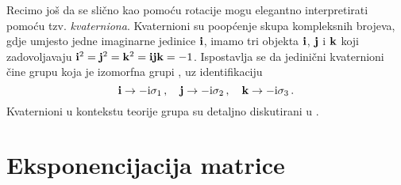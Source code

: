 Recimo još da se slično kao pomoću  rotacije mogu elegantno
interpretirati pomoću tzv. \emph{kvaterniona}. Kvaternioni su poopćenje 
skupa kompleksnih brojeva, gdje umjesto jedne imaginarne jedinice $\vec{{\rm i}}$,
imamo tri objekta $\vec{{\rm i}}$, $\vec{{\rm j}}$ i $\vec{{\rm k}}$ koji zadovoljavaju
$\vec{{\rm i}}^2 = \vec{{\rm j}}^2 = \vec{{\rm k}}^2 = \vec{{\rm i}}\vec{{\rm j}}\vec{{\rm k}} = -1$. 
Ispostavlja se da jedinični kvaternioni čine grupu koja
je izomorfna grupi , uz identifikaciju
\begin{equation}
    \vec{{\rm i}} \to -\rmi \sigma_1\,, \quad
    \vec{{\rm j}} \to -\rmi \sigma_2\,, \quad
    \vec{{\rm k}} \to -\rmi \sigma_3\,.
\end{equation}
Kvaternioni u kontekstu teorije grupa su detaljno diskutirani u \cite{Stilwell:2008}.

\chapter{Eksponencijacija matrice}
\label{sec:expmat}


